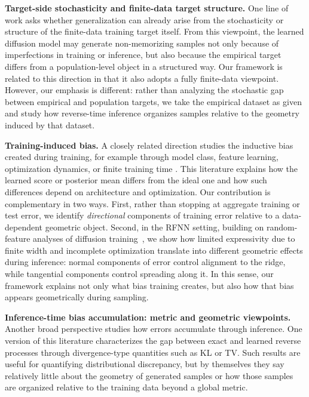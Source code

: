 \documentclass[11pt]{article}
\begin{document}
\noindent\textbf{Target-side stochasticity and finite-data target structure.}
One line of work \citep[e.g.,][]{vastola2025generalization,bertrand2025closed} asks whether generalization can already arise from the stochasticity or structure of the finite-data training target itself. From this viewpoint, the learned diffusion model may generate non-memorizing samples not only because of imperfections in training or inference, but also because the empirical target differs from a population-level object in a structured way. Our framework is related to this direction in that it also adopts a fully finite-data viewpoint. However, our emphasis is different: rather than analyzing the stochastic gap between empirical and population targets, we take the empirical dataset as given and study how reverse-time inference organizes samples relative to the geometry induced by that dataset.

\noindent\textbf{Training-induced bias.}
A closely related direction studies the inductive bias created during training, for example through model class, feature learning, optimization dynamics, or finite training time \citep[e.g.,][]{kamb2024analytic,shah2025does,wu2025taking,bonnaire2025diffusion}. This literature explains how the learned score or posterior mean differs from the ideal one and how such differences depend on architecture and optimization. Our contribution is complementary in two ways. First, rather than stopping at aggregate training or test error, we identify \emph{directional} components of training error relative to a data-dependent geometric object. Second, in the RFNN setting, building on random-feature analyses of diffusion training~\citep{george2025denoising,bonnaire2025diffusion}, we show how limited expressivity due to finite width and incomplete optimization translate into different geometric effects during inference: normal components of error control alignment to the ridge, while tangential components control spreading along it. In this sense, our framework explains not only what bias training creates, but also how that bias appears geometrically during sampling.

\noindent\textbf{Inference-time bias accumulation: metric and geometric viewpoints.}
Another broad perspective studies how errors accumulate through inference. One version of this literature \citep[e.g.,][]{lee2022convergence,chen2023improved,benton2024nearly,wang2024evaluating} characterizes the gap between exact and learned reverse processes through divergence-type quantities such as KL or TV. Such results are useful for quantifying distributional discrepancy, but by themselves they say relatively little about the geometry of generated samples or how those samples are organized relative to the training data beyond a global metric.
\end{document}
